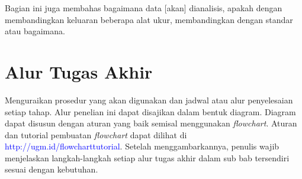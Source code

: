 Bagian ini juga membahas bagaimana data [akan] dianalisis, apakah dengan membandingkan keluaran beberapa alat ukur, membandingkan dengan standar atau bagaimana.

\section{Alur Tugas Akhir}

Menguraikan prosedur yang akan digunakan dan jadwal atau alur penyelesaian setiap 
tahap. Alur penelian ini dapat disajikan dalam bentuk diagram. Diagram dapat disusun dengan aturan yang baik semisal menggunakan \textit{flowchart}. Aturan dan tutorial pembuatan \textit{flowchart} dapat dilihat di \textcolor{blue}{http://ugm.id/flowcharttutorial}. Setelah menggambarkannya, penulis wajib menjelaskan langkah-langkah setiap alur tugas akhir dalam sub bab tersendiri sesuai dengan kebutuhan.


